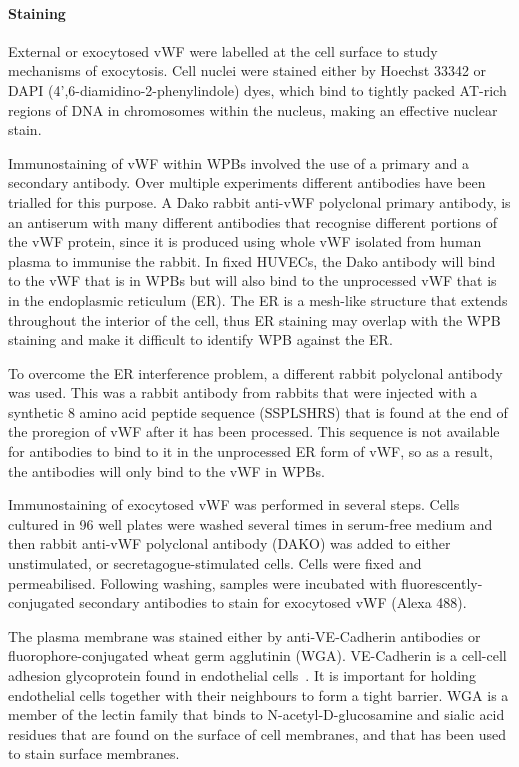 \paragraph{Staining}
External or exocytosed vWF were labelled at the cell surface to study mechanisms of exocytosis. Cell nuclei were stained either by Hoechst 33342 or DAPI (4',6-diamidino-2-phenylindole) dyes, which bind to tightly packed AT-rich regions of DNA in chromosomes within the nucleus, making an effective nuclear stain.

Immunostaining of vWF within WPBs involved the use of a primary and a secondary antibody. Over multiple experiments different antibodies have been trialled for this purpose. A Dako rabbit anti-vWF polyclonal primary antibody, is an antiserum with many different antibodies that recognise different portions of the vWF protein, since it is produced using whole vWF isolated from human plasma to immunise the rabbit. In fixed HUVECs, the Dako antibody will bind to the vWF that is in WPBs but will also bind to the unprocessed vWF that is in the endoplasmic reticulum (ER). The ER is a mesh-like structure that extends throughout the interior of the cell, thus ER staining may overlap with the WPB staining and make it difficult to identify WPB against the ER.

To overcome the ER interference problem, a different rabbit polyclonal antibody was used. This was a rabbit antibody from rabbits that were injected with a synthetic 8 amino acid peptide sequence (SSPLSHRS) that is found at the end of the proregion of vWF after it has been processed. This sequence is not available for antibodies to bind to it in the unprocessed ER form of vWF, so as a result, the antibodies will only bind to the vWF in WPBs.

Immunostaining of exocytosed vWF was performed in several steps. Cells cultured in 96 well plates were washed several times in serum-free medium and then rabbit anti-vWF polyclonal antibody (DAKO) was added to either unstimulated, or secretagogue-stimulated cells. Cells were fixed and permeabilised. Following washing, samples were incubated with fluorescently-conjugated secondary antibodies to stain for exocytosed vWF (Alexa 488).

The plasma membrane was stained either by anti-VE-Cadherin antibodies or fluorophore-conjugated wheat germ agglutinin (WGA). VE-Cadherin is a cell-cell adhesion glycoprotein found in endothelial cells~\cite{Vestweber2008}. It is important for holding endothelial cells together with their neighbours to form a tight barrier. WGA is a member of the lectin family that binds to N-acetyl-D-glucosamine and sialic acid residues that are found on the surface of cell membranes, and that has been used to stain surface membranes.

